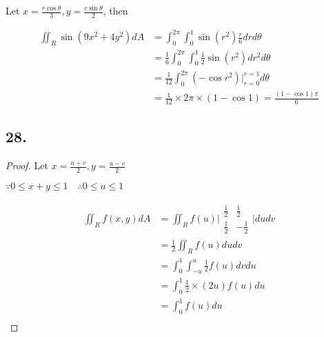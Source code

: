 \documentclass{article}
\begin{document}
  Let $x = \frac{r\cos \theta}{3}, y = \frac{r \sin \theta}{2}$, then

  $$\begin{aligned}
    \iint_R \sin (9x^2+4y^2) dA  &= \int_0^{2\pi} \int_0^1 \sin (r^2) \frac{r}{6} dr d\theta \\
    &= \frac 1 6 \int_0^{2\pi} \int_0^1 \frac 1 2 \sin(r^2) dr^2 d\theta \\
    &= \frac{1}{12} \int_0^{2\pi} (-\cos r^2)\biggl|_{r=0}^{r=1} d\theta \\ 
    &= \frac{1}{12} \times 2\pi \times (1 - \cos 1) = \frac{(1-\cos 1)\pi}{6}
  \end{aligned}$$

  \subsection*{28. }

  \begin{proof}
    Let $x = \frac{u + v}{2}, y = \frac{u - v}{2}$

    $\because 0 \leq x + y \leq 1 \quad \therefore 0 \leq u \leq 1$

    $$\begin{aligned}
      \iint_R f(x, y) dA &= \iint_R f(u) \biggl| \begin{matrix}
        \frac 1 2 & \frac 1 2 \\ \frac 1 2 & -\frac 1 2
      \end{matrix} \biggl| du dv \\
      &= \frac 1 2 \iint_R f(u) du dv \\
      &= \int_0^1 \int_{-u}^{u} \frac 1 2  f(u) dv du \\
      &= \int_0^1 \frac 1 2 \times (2u) f(u) du \\
      &= \int_0^1 f(u) du \\
    \end{aligned}$$
  \end{proof}
\end{document}

